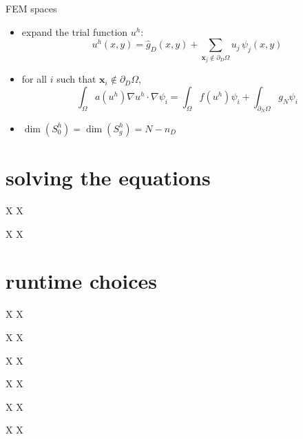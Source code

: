 \documentclass[hide notes,intlimits,usenames,dvipsnames]{beamer}
\newcommand{\bx}{\mathbf{x}}
\newcommand{\grad}{\nabla}
\begin{document}
\begin{frame}{FEM spaces}
\begin{itemize}
\item expand the trial function $u^h$:
\begin{equation*}
u^h(x,y) = \hat g_D(x,y) + \sum_{\bx_j \notin \partial_D \Omega} u_j\, \psi_j(x,y)
\end{equation*}
\item for all $i$ such that $\bx_i \notin \partial_D \Omega$,
\begin{equation*}
\int_\Omega a(u^h) \grad u^h \cdot \grad \psi_i = \int_\Omega f(u^h) \psi_i + \int_{\partial_N\Omega} g_N \psi_i
\end{equation*}
\item $\dim(S_{0}^h)=\dim(S_{g}^h)=N-n_D$
\end{itemize}
\end{frame}

\section{solving the equations}

\begin{frame}{X}
X
\end{frame}

\begin{frame}{X}
X
\end{frame}

\section{runtime choices}

\begin{frame}{X}
X
\end{frame}

\begin{frame}{X}
X
\end{frame}

\begin{frame}{X}
X
\end{frame}

\begin{frame}{X}
X
\end{frame}

\begin{frame}{X}
X
\end{frame}

\begin{frame}{X}
X
\end{frame}
\end{document}

